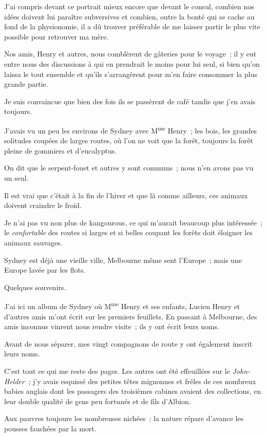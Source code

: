 \documentclass[french,twoside]{book} %
\begin{document}
J’ai compris devant ce portrait mieux encore que devant le consul, combien nos idées doivent lui paraître subversives et combien, outre la bonté qui se cache au fond de la physionomie, il a dû trouver préférable de me laisser partir le plus vite possible pour retrouver ma mère.\par
Nos amis, Henry et autres, nous comblèrent de gâteries pour le voyage ; il y eut entre nous des discussions à qui en prendrait le moins pour lui seul, si bien qu’on laissa le tout ensemble et qu’ils s’arrangèrent pour m’en faire consommer la plus grande partie.\par
Je suis convaincue que bien des fois ils se passèrent de café tandis que j’en avais toujours.\par
J’avais vu un peu les environs de Sydney avec M\textsuperscript{me} Henry ; les bois, les grandes solitudes coupées de larges routes, où l’on ne voit que la forêt, toujours la forêt pleine de gommiers et d’eucalyptus.\par
On dit que le serpent-fouet et autres y sont communs ; nous n’en avons pas vu un seul.\par
Il est vrai que c’était à la fin de l’hiver et que  là comme ailleurs, ces animaux doivent craindre le froid.\par
Je n’ai pas vu non plus de kangourous, ce qui m’aurait beaucoup plus intéressée ; le \emph{confortable} des routes si larges et si belles coupant les forêts doit éloigner les animaux sauvages.\par
Sydney est déjà une vieille ville, Melbourne même sent l’Europe ; mais une Europe lavée par les flots.\par
Quelques souvenirs.\par
J’ai ici un album de Sydney où M\textsuperscript{me} Henry et ses enfants, Lucien Henry et d’autres amis m’ont écrit sur les premiers feuillets. En passant à Melbourne, des amis inconnus vinrent nous rendre visite ; ils y ont écrit leurs noms.\par
Avant de nous séparer, mes vingt compagnons de route y ont également inscrit leurs noms.\par
C’est tout ce qui me reste des pages. Les autres ont été effeuillées sur le \emph{John-Helder ;} j’y avais esquissé des petites têtes mignonnes et frêles de ces nombreux babies anglais dont les passagers des troisièmes cabines avaient des collections, en leur double qualité de gens peu fortunés et de fils d’Albion.\par
Aux pauvres toujours les nombreuses nichées ; la nature répare d’avance les pousses fauchées par la mort.\par
\end{document}
